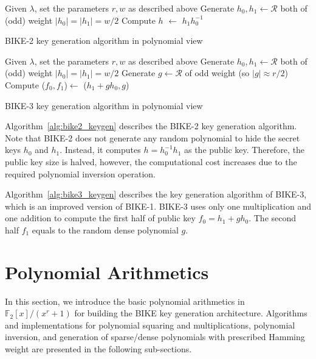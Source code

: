 \documentclass[runningheads]{llncs}
\begin{document}
\begin{algorithm}[!tbh]
 \DontPrintSemicolon %
    Given $\lambda$, set the parameters $r,w$ as described above\;
    Generate $h_0,h_1 \gets \mathcal{R}$ both of (odd) weight $|h_0|=|h_1|=w/2$\;
    Compute $h$ $\gets$ $h_1h_0^{-1}$\;
 \caption{BIKE-2 key generation algorithm in polynomial view  \cite{aragon2017bike}}\label{alg:bike2_keygen}
\end{algorithm}

\begin{algorithm}[!tbh]
 \DontPrintSemicolon %
    Given $\lambda$, set the parameters $r,w$ as described above\;
    Generate $h_0,h_1 \gets \mathcal{R}$ both of (odd) weight $|h_0|=|h_1|=w/2$\;
    Generate $g \gets \mathcal{R}$ of odd weight (so $|g|\approx r/2$)\;
    Compute ($f_0,f_1$)$\gets$ ($h_1+gh_0,g$)\;
 \caption{BIKE-3 key generation algorithm in polynomial view  \cite{aragon2017bike}}\label{alg:bike3_keygen}
\end{algorithm}


Algorithm~\ref{alg:bike2_keygen} describes the BIKE-2 key generation algorithm. Note that BIKE-2 does not generate any random polynomial to hide the secret keys $h_0$ and $h_1$. Instead, it computes $h=h_0^{-1}h_1$ as the public key.
Therefore, the public key size is halved, however, the computational cost
increases due to the required polynomial inversion operation.

Algorithm~\ref{alg:bike3_keygen} describes the key generation algorithm of BIKE-3,
which is an improved version of BIKE-1.
BIKE-3 uses only one multiplication and one addition to compute the first half of public key $f_0=h_1+gh_0$. The second half $f_1$ equals to the random dense polynomial $g$.

\section{Polynomial Arithmetics}
\label{sec::modules}
In this section, we introduce the basic polynomial arithmetics
in $\mathbb{F}_2[x]/(x^r+1)$
for building the BIKE key generation architecture.
Algorithms and implementations for
polynomial squaring and multiplications,
polynomial inversion,
and generation of sparse/dense polynomials with prescribed Hamming weight
are presented in the following sub-sections.
\end{document}
